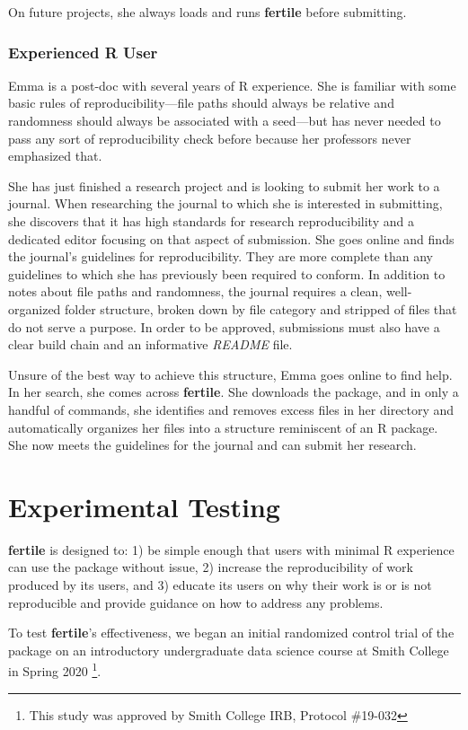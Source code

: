 \documentclass[APA,LATO1COL]{WileyNJD-v2}\usepackage[]{graphicx}\usepackage[]{color}
\newcommand{\R}{\textsf{R}\xspace}
\newcommand{\cmd}[1]{\textit{#1}}
\newcommand{\pkg}[1]{\textbf{#1}}
\begin{document}
On future projects, she always loads and runs \pkg{fertile} before submitting.

\subsubsection{Experienced \R User}

Emma is a post-doc with several years of \R experience. She is familiar with some basic rules of reproducibility---file paths should always be relative and randomness should always be associated with a seed---but has never needed to pass any sort of reproducibility check before because her professors never emphasized that.

She has just finished a research project and is looking to submit her work to a journal. When researching the journal to which she is interested in submitting, she discovers that it has high standards for research reproducibility and a dedicated editor focusing on that aspect of submission. She goes online and finds the journal's guidelines for reproducibility. They are more complete than any guidelines to which she has previously been required to conform. In addition to notes about file paths and randomness, the journal requires a clean, well-organized folder structure, broken down by file category and stripped of files that do not serve a purpose. In order to be approved, submissions must also have a clear build chain and an informative \cmd{README} file.

Unsure of the best way to achieve this structure, Emma goes online to find help. In her search, she comes across \pkg{fertile}. She downloads the package, and in only a handful of commands, she identifies and removes excess files in her directory and automatically organizes her files into a structure reminiscent of an \R package. She now meets the guidelines for the journal and can submit her research.

\section{Experimental Testing}

\pkg{fertile} is designed to: 1) be simple enough that users with minimal \R experience can use the package without issue, 2) increase the reproducibility of work produced by its users, and 3) educate its users on why their work is or is not reproducible and provide guidance on how to address any problems.

To test \pkg{fertile}'s effectiveness, we began an initial randomized control trial of the package on an introductory undergraduate data science course at Smith College in Spring 2020 \footnote{This study was approved by Smith College IRB, Protocol \#19-032}.
\end{document}
